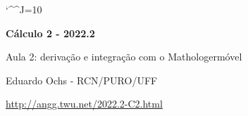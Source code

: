 \documentclass[oneside,12pt]{article}
\begin{document}
\catcode`\^^J=10
\pu
\def\pictgridstyle{\color{GrayPale}\linethickness{0.3pt}}
\def\pictaxesstyle{\linethickness{0.5pt}}
\def\pictnaxesstyle{\color{GrayPale}\linethickness{0.5pt}}
\celllower=2.5pt


\def\u#1{\par{\footnotesize \url{#1}}}

\def\drafturl{http://angg.twu.net/LATEX/2022-2-C2.pdf}
\def\drafturl{http://angg.twu.net/2022.2-C2.html}
\def\draftfooter{\tiny \href{\drafturl}{\jobname{}} \ColorBrown{\shorttoday{} \hours}}



%

\thispagestyle{empty}

\begin{center}

\vspace*{1.2cm}

{\bf \Large Cálculo 2 - 2022.2}

\bsk

Aula 2: derivação e integração com o Mathologermóvel

\bsk

Eduardo Ochs - RCN/PURO/UFF

\url{http://angg.twu.net/2022.2-C2.html}

\end{center}

\newpage

\end{document}
